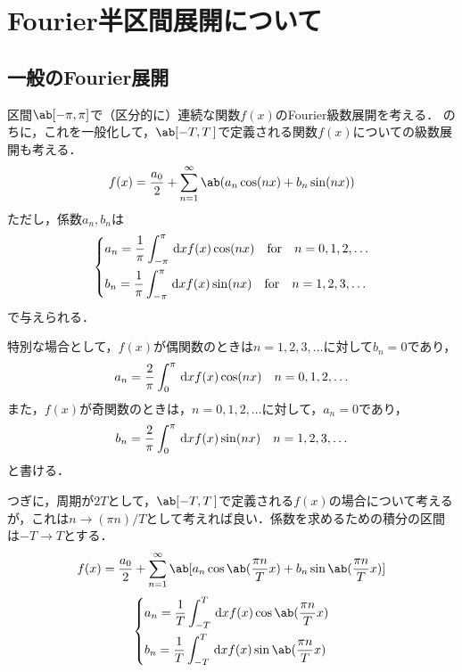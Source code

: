\section{Fourier半区間展開について}
\subsection{一般のFourier展開}
区間$\ab[-\pi, \pi]$で（区分的に）連続な関数$f(x)$のFourier級数展開を考える．
のちに，これを一般化して，$\ab[-T, T\,]$で定義される関数$f(x)$についての級数展開も考える．
\begin{gather}  
  f(x) = \frac{a_0}{2} + \sum_{n=1}^\infty \ab(a_n\cos(nx) + b_n\sin(nx))
\end{gather}
ただし，係数$a_n, b_n$は
\begin{gather}
  \begin{dcases}
    a_n = \frac{1}{\pi} \int_{-\pi}^{\pi} \dl{x} f(x) \cos (nx) \qq\text{for}\qq n = 0, 1, 2, \ldots\\
    b_n = \frac{1}{\pi} \int_{-\pi}^{\pi} \dl{x} f(x) \sin (nx) \qq\text{for}\qq n = 1, 2, 3, \ldots\\
  \end{dcases}
\end{gather}
で与えられる．

特別な場合として，$f(x)$が偶関数のときは$n = 1, 2, 3, \ldots$に対して$b_n = 0$であり，
\begin{gather}
  a_n = \frac{2}{\pi} \int_0^\pi \dl{x} f(x) \cos(nx) \qq n = 0, 1, 2, \ldots
\end{gather}
また，$f(x)$が奇関数のときは，$n = 0, 1, 2, \ldots$に対して，$a_n = 0$であり，
\begin{gather}
  b_n = \frac{2}{\pi} \int_0^\pi \dl{x} f(x) \sin(nx) \qq n = 1, 2, 3, \ldots
\end{gather}
と書ける．

つぎに，周期が$2T$として，$\ab[-T, T\,]$で定義される$f(x)$の場合について考えるが，これは$n \to (\pi n)/T$として考えれば良い．係数を求めるための積分の区間は$-T\to T$とする．
\begin{gather}  
  f(x) = \frac{a_0}{2} + \sum_{n=1}^\infty \ab[a_n\cos\ab(\frac{\pi n}{T}x) + b_n \sin\ab(\frac{\pi n}{T}x)]
\end{gather}
\begin{gather}
  \begin{dcases}
    a_n = \frac{1}{T} \int_{-T}^T \dl{x} f(x) \cos\ab(\frac{\pi n}{T}x)\\
    b_n = \frac{1}{T} \int_{-T}^T \dl{x} f(x) \sin\ab(\frac{\pi n}{T}x)
  \end{dcases}
\end{gather}

